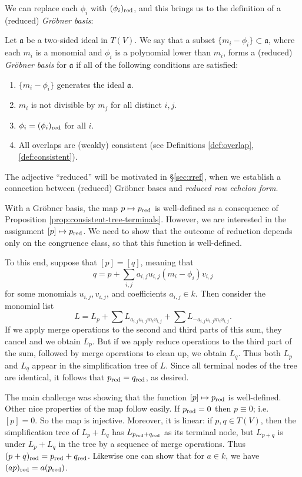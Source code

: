 We can replace each $\phi_i$ with $(\phi_i)_{\mathrm{red}}$, and this brings us to the definition of a (reduced) \emph{Gr\"obner basis}:
\begin{defn}
	Let $\mathfrak{a}$ be a two-sided ideal in $T(V)$. We say that a subset $\{m_i - \phi_i\}\subset \mathfrak{a}$, where each $m_i$ is a monomial and $\phi_i$ is a polynomial lower than $m_i$, forms a (reduced) \emph{Gr\"obner basis} for $\mathfrak{a}$ if all of the following conditions are satisfied:
	\begin{enumerate}
		\item $\{m_i - \phi_i\}$ generates the ideal $\mathfrak{a}$.
		\item $m_i$ is not divisible by $m_j$ for all distinct $i,j$.
		\item $\phi_i = (\phi_i)_{\mathrm{red}}$ for all $i$.
		\item All overlaps are (weakly) consistent (see Definitions \ref{def:overlap}, \ref{def:consistent}).
	\end{enumerate}
\end{defn}
The adjective ``reduced'' will be motivated in \S\ref{sec:rref}, when we establish a connection between (reduced) Gr\"obner bases and \emph{reduced row echelon form}.

With a Gr\"obner basis, the map $p\mapsto p_{\mathrm{red}}$ is well-defined as a consequence of Proposition \ref{prop:consistent-tree-terminals}. However, we are interested in the assignment $[p]\mapsto p_{\mathrm{red}}$. We need to show that the outcome of reduction depends only on the congruence class, so that this function is well-defined.

To this end, suppose that $[p] = [q]$, meaning that
\[
	q = p + \sum_{i,j} a_{i,j}u_{i,j} (m_i - \phi_i) v_{i,j}
\]
for some monomials $u_{i,j}, v_{i,j}$, and coefficients $a_{i,j}\in k$. Then consider the monomial list
\[
	L= L_p + \sum L_{a_{i,j}u_{i,j}m_iv_{i,j}} + \sum L_{-a_{i,j}u_{i,j}m_i v_{i,j}}.
\]
If we apply merge operations to the second and third parts of this sum, they cancel and we obtain $L_p$. But if we apply reduce operations to the third part of the sum, followed by merge operations to clean up, we obtain $L_q$. Thus both $L_p$ and $L_q$ appear in the simplification tree of $L$. Since all terminal nodes of the tree are identical, it follows that $p_{\mathrm{red}} = q_{\mathrm{red}}$, as desired.

The main challenge was showing that the function $[p] \mapsto p_{\mathrm{red}}$ is well-defined. Other nice properties of the map follow easily. If $p_{\mathrm{red}} = 0$ then $p \equiv 0$; i.e. $[p]=0$. So the map is injective. Moreover, it is linear: if $p,q\in T(V)$, then the simplification tree of $L_p + L_q$ has $L_{p_{\mathrm{red}}+q_{\mathrm{red}}}$ as its terminal node, but $L_{p+q}$ is under $L_p + L_q$ in the tree by a sequence of merge operations. Thus $(p+q)_{\mathrm{red}} = p_{\mathrm{red}} + q_{\mathrm{red}}$. Likewise one can show that for $a \in k$, we have $(ap)_{\mathrm{red}} = a(p_{\mathrm{red}})$.

